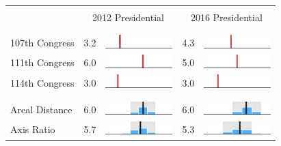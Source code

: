 
\begin{table}
\renewcommand{\arraystretch}{0.7}
 \begin{tabular}{l rm{7em} rm{7em}}
\hline \hline \\

{} & \multicolumn{2}{c}{2012 Presidential} & \multicolumn{2}{c}{2016 Presidential} \\

\\ \hline \\
107th Congress         &   3.2 &          \includegraphics[width=7em]{mini_hist/NC_2012_107} &   4.3 &          \includegraphics[width=7em]{mini_hist/NC_2016_107} \\
111th Congress         &   6.0 &          \includegraphics[width=7em]{mini_hist/NC_2012_111} &   5.0 &          \includegraphics[width=7em]{mini_hist/NC_2016_111} \\
114th Congress         &   3.0 &          \includegraphics[width=7em]{mini_hist/NC_2012_114} &   3.0 &          \includegraphics[width=7em]{mini_hist/NC_2016_114} \\
\\ \hline \\ 
Areal Distance         &   6.0 &       \includegraphics[width=7em]{mini_hist/NC_2012_dist_a} &   6.0 &       \includegraphics[width=7em]{mini_hist/NC_2016_dist_a} \\
Axis Ratio             &   5.7 &   \includegraphics[width=7em]{mini_hist/NC_2012_axis_ratio} &   5.3 &   \includegraphics[width=7em]{mini_hist/NC_2016_axis_ratio} \\

\end{tabular}
\end{table}
